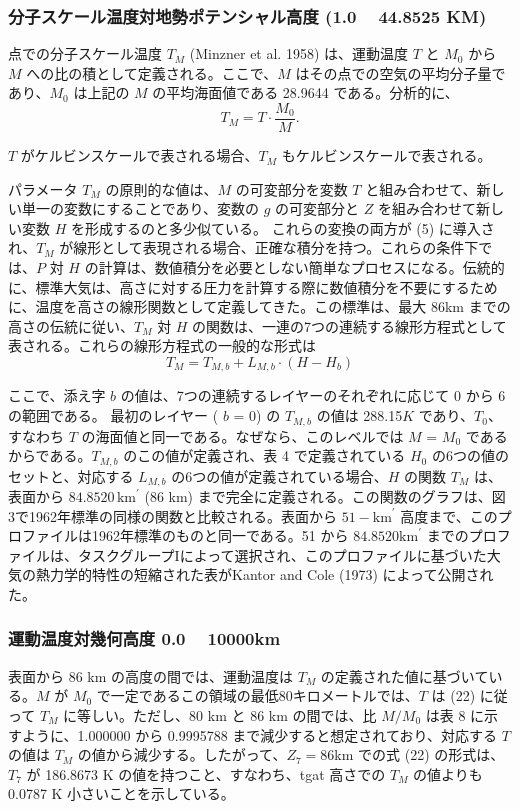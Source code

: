 \documentclass{article}
\begin{document}
\subsubsection{分子スケール温度対地勢ポテンシャル高度 (1.0 ~ 44.8525 KM)}

点での分子スケール温度 $T_M$ (Minzner et al. 1958) は、運動温度 $T$ と $M_0$ から $M$ への比の積として定義される。ここで、$M$ はその点での空気の平均分子量であり、$M_0$ は上記の $M$ の平均海面値である 28.9644 である。分析的に、
\begin{equation}
  T_M = T \cdot \frac{M_0}{M}. \tag{22}
\end{equation}

$T$ がケルビンスケールで表される場合、$T_M$ もケルビンスケールで表される。

パラメータ $T_M$ の原則的な値は、$M$ の可変部分を変数 $T$ と組み合わせて、新しい単一の変数にすることであり、変数の $g$ の可変部分と $Z$ を組み合わせて新しい変数 $H$ を形成するのと多少似ている。
これらの変換の両方が (5) に導入され、$T_M$ が線形として表現される場合、正確な積分を持つ。これらの条件下では、$P$ 対 $H$ の計算は、数値積分を必要としない簡単なプロセスになる。伝統的に、標準大気は、高さに対する圧力を計算する際に数値積分を不要にするために、温度を高さの線形関数として定義してきた。この標準は、最大 86km までの高さの伝統に従い、$T_M$ 対 $H$ の関数は、一連の7つの連続する線形方程式として表される。これらの線形方程式の一般的な形式は
\begin{equation}
  T_M = T_{M,b} + L_{M,b}\cdot (H - H_b)
  \tag{23}
\end{equation}

ここで、添え字 $b$ の値は、7つの連続するレイヤーのそれぞれに応じて 0 から 6 の範囲である。
最初のレイヤー ( $b$ = 0) の $T_{M,b}$ の値は 288.15$K$ であり、$T_0$、すなわち $T$ の海面値と同一である。なぜなら、このレベルでは $M$ = $M_0$ であるからである。$T_{M,b}$ のこの値が定義され、表 4 で定義されている $H_0$ の6つの値のセットと、対応する $L_{M,b}$ の6つの値が定義されている場合、$H$ の関数 $T_M$ は、表面から $84.8520 \, \text{km}^{\prime}$ (86 km) まで完全に定義される。この関数のグラフは、図3で1962年標準の同様の関数と比較される。表面から $51-\text{km}^\prime$ 高度まで、このプロファイルは1962年標準のものと同一である。51 から $84.8520 \text{km}^\prime$ までのプロファイルは、タスクグループIによって選択され、このプロファイルに基づいた大気の熱力学的特性の短縮された表がKantor and Cole (1973) によって公開された。

\subsubsection{運動温度対幾何高度 0.0 ~ 10000km}
表面から 86 km の高度の間では、運動温度は $T_M$ の定義された値に基づいている。$M$ が $M_0$ で一定であるこの領域の最低80キロメートルでは、$T$ は (22) に従って $T_M$ に等しい。ただし、80 km と 86 km の間では、比 $M/M_0$ は表 8 に示すように、1.000000 から 0.9995788 まで減少すると想定されており、対応する $T$ の値は $T_M$ の値から減少する。したがって、$Z_7 = 86$km での式 (22) の形式は、$T_7$ が 186.8673 K の値を持つこと、すなわち、tgat 高さでの $T_M$ の値よりも 0.0787 K 小さいことを示している。
\end{document}
